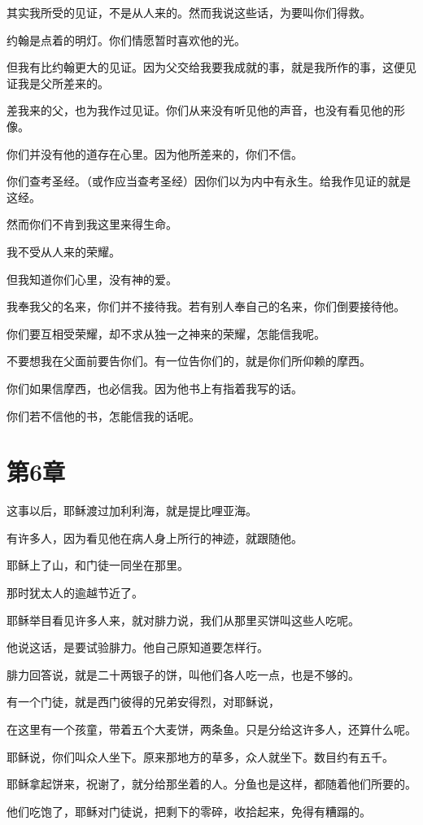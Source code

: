 \documentclass[12pt,oneside]{book}
\begin{document}
其实我所受的见证，不是从人来的。然而我说这些话，为要叫你们得救。

约翰是点着的明灯。你们情愿暂时喜欢他的光。

但我有比约翰更大的见证。因为父交给我要我成就的事，就是我所作的事，这便见证我是父所差来的。

差我来的父，也为我作过见证。你们从来没有听见他的声音，也没有看见他的形像。

你们并没有他的道存在心里。因为他所差来的，你们不信。

你们查考圣经。（或作应当查考圣经）因你们以为内中有永生。给我作见证的就是这经。

然而你们不肯到我这里来得生命。

我不受从人来的荣耀。

但我知道你们心里，没有神的爱。

我奉我父的名来，你们并不接待我。若有别人奉自己的名来，你们倒要接待他。

你们要互相受荣耀，却不求从独一之神来的荣耀，怎能信我呢。

不要想我在父面前要告你们。有一位告你们的，就是你们所仰赖的摩西。

你们如果信摩西，也必信我。因为他书上有指着我写的话。

你们若不信他的书，怎能信我的话呢。

\chapter{第6章}
这事以后，耶稣渡过加利利海，就是提比哩亚海。

有许多人，因为看见他在病人身上所行的神迹，就跟随他。

耶稣上了山，和门徒一同坐在那里。

那时犹太人的逾越节近了。

耶稣举目看见许多人来，就对腓力说，我们从那里买饼叫这些人吃呢。

他说这话，是要试验腓力。他自己原知道要怎样行。

腓力回答说，就是二十两银子的饼，叫他们各人吃一点，也是不够的。

有一个门徒，就是西门彼得的兄弟安得烈，对耶稣说，

在这里有一个孩童，带着五个大麦饼，两条鱼。只是分给这许多人，还算什么呢。

耶稣说，你们叫众人坐下。原来那地方的草多，众人就坐下。数目约有五千。

耶稣拿起饼来，祝谢了，就分给那坐着的人。分鱼也是这样，都随着他们所要的。

他们吃饱了，耶稣对门徒说，把剩下的零碎，收拾起来，免得有糟蹋的。
\end{document}

